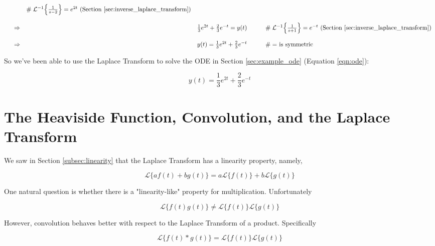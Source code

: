 \documentclass{article}
\theoremstyle{definition}
\begin{document}
\begin{equation*}
\begin{array}{lllll}
                                                                                                                   &\qquad \mathrel{\#} \text{$\mathcal{L}^{-1} \Big \{ \frac{1}{s-2} \Big \} = e^{2t}$ (Section \ref{sec:inverse_laplace_transform})}  \\
[15pt]
&\Rightarrow& \frac{1}{3} e^{2t} + \frac{2}{3} e^{-t} = y(t)                          &\qquad \mathrel{\#} \text{$\mathcal{L}^{-1} \Big \{ \frac{1}{s+1} \Big \} = e^{-t}$ (Section \ref{sec:inverse_laplace_transform})}  \\
[15pt]
&\Rightarrow& y(t) = \frac{1}{3} e^{2t} + \frac{2}{3} e^{-t}                          &\qquad \mathrel{\#} \text{$=$ is symmetric}
\end{array}
\end{equation*}


\bigskip
\noindent
So we've been able to use the Laplace Transform to solve the ODE
in Section \ref{sec:example_ode} (Equation \ref{eqn:ode}):

\bigskip
\begin{equation*}
y(t) = \frac{1}{3} e^{2t} + \frac{2}{3} e^{-t}   
\end{equation*}

\section{\large The Heaviside Function, Convolution, and the Laplace Transform}
We saw in Section \ref{subsec:linearity} that the Laplace
Transform has a linearity property, namely,

\bigskip
\begin{equation*}
\mathcal{L}\{af (t) + bg(t)\} = a\mathcal{L}\{f(t)\} + b\mathcal{L}\{g(t)\}
\end{equation*}

\bigskip
\noindent
One natural question is whether there is a "linearity-like"
property for multiplication. Unfortunately

\bigskip
\begin{equation*}
\mathcal{L}\{f(t)g(t)\} \neq  \mathcal{L}\{f(t)\}\mathcal{L}\{g(t)\}
\end{equation*}

\bigskip
\noindent
However, convolution behaves better with respect to the Laplace
Transform of a product. Specifically 

\bigskip
\begin{equation}
\mathcal{L}\{f(t) \ast g(t)\} =  \mathcal{L}\{f(t)\}\mathcal{L}\{g(t)\}
\label{eqn:lt_of_convolution}
\end{equation}
\end{document}
